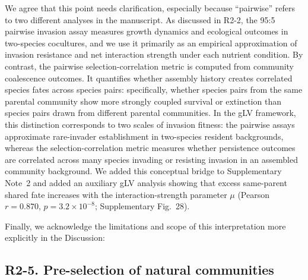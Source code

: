 \responselabel
We agree that this point needs clarification, especially because ``pairwise'' refers to two different analyses in the manuscript. As discussed in R2-2, the 95:5 pairwise invasion assay measures growth dynamics and ecological outcomes in two-species cocultures, and we use it primarily as an empirical approximation of invasion resistance and net interaction strength under each nutrient condition. By contrast, the pairwise selection-correlation metric is computed from community coalescence outcomes. It quantifies whether assembly history creates correlated species fates across species pairs: specifically, whether species pairs from the same parental community show more strongly coupled survival or extinction than species pairs drawn from different parental communities. In the gLV framework, this distinction corresponds to two scales of invasion fitness: the pairwise assays approximate rare-invader establishment in two-species resident backgrounds, whereas the selection-correlation metric measures whether persistence outcomes are correlated across many species invading or resisting invasion in an assembled community background. We added this conceptual bridge to Supplementary Note~2 and added an auxiliary gLV analysis showing that excess same-parent shared fate increases with the interaction-strength parameter $\mu$ (Pearson $r = 0.870$, $p = 3.2 \times 10^{-8}$; Supplementary Fig.~28).

Finally, we acknowledge the limitations and scope of this interpretation more explicitly in the Discussion:   

\subsection*{R2-5. Pre-selection of natural communities}

